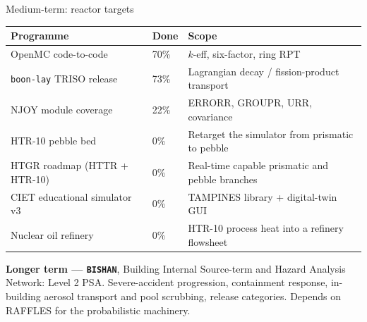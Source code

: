 \documentclass[aspectratio=169,11pt]{beamer}
\begin{document}
\begin{frame}{Medium-term: reactor targets}
  \footnotesize
  \setlength{\tabcolsep}{4pt}
  \begin{tabular}{@{}p{}p{}p{}@{}}
    \toprule
    \textbf{Programme} & \textbf{Done} & \textbf{Scope} \\
    \midrule
    OpenMC code-to-code & 70\% & $k$-eff, six-factor, ring RPT \cite{openmc} \\
    \texttt{boon-lay} TRISO release & 73\% & Lagrangian decay / fission-product transport \\
    NJOY module coverage & 22\% & ERRORR, GROUPR, URR, covariance \\
    HTR-10 pebble bed & 0\% & Retarget the simulator from prismatic to pebble \cite{htr10} \\
    HTGR roadmap (HTTR + HTR-10) & 0\% & Real-time capable prismatic and pebble branches \\
    CIET educational simulator v3 & 0\% & TAMPINES library + digital-twin GUI \\
    Nuclear oil refinery & 0\% & HTR-10 process heat into a refinery flowsheet \\
    \bottomrule
  \end{tabular}
  \vspace{0.8em}

  \textbf{Longer term --- \texttt{BISHAN}}, Building Internal Source-term and
  Hazard Analysis Network: Level 2 PSA. Severe-accident progression, containment
  response, in-building aerosol transport and pool scrubbing, release categories.
  Depends on RAFFLES for the probabilistic machinery.
\end{frame}
\end{document}
